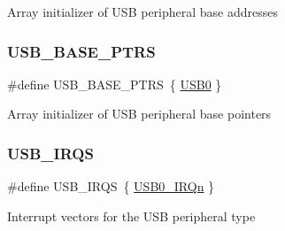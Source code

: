 Array initializer of U\+SB peripheral base addresses \mbox{\label{group___u_s_b___peripheral___access___layer_gabb481a231c7c57907377d7ee985f826c}} 
\subsubsection{\texorpdfstring{USB\_BASE\_PTRS}{USB\_BASE\_PTRS}}
{\footnotesize\ttfamily \#define U\+S\+B\+\_\+\+B\+A\+S\+E\+\_\+\+P\+T\+RS~\{ \mbox{\hyperlink{group___u_s_b___peripheral___access___layer_gaea56c015ce8ad0cc88464060fde6d87c}{U\+S\+B0}} \}}

Array initializer of U\+SB peripheral base pointers \mbox{\label{group___u_s_b___peripheral___access___layer_ga17e92a5c4b8217467adbbc5ab517c72f}} 
\subsubsection{\texorpdfstring{USB\_IRQS}{USB\_IRQS}}
{\footnotesize\ttfamily \#define U\+S\+B\+\_\+\+I\+R\+QS~\{ \mbox{\hyperlink{group___interrupt__vector__numbers_gga666eb0caeb12ec0e281415592ae89083ad85ea858fda8e15398b5aa74c019cb7a}{U\+S\+B0\+\_\+\+I\+R\+Qn}} \}}

Interrupt vectors for the U\+SB peripheral type 